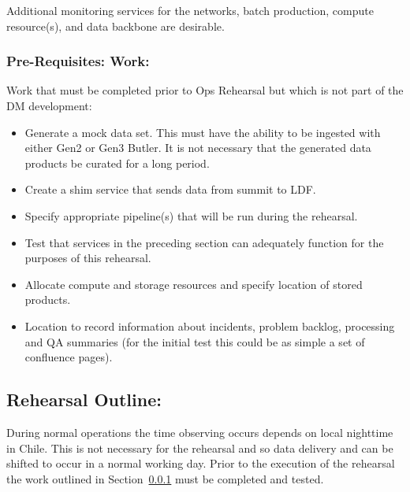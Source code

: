 Additional monitoring services for the networks, batch production, compute 
resource(s), and data backbone are desirable.

\subsubsection{Pre-Requisites: Work:}\label{prework}

Work that must be completed prior to Ops Rehearsal but which is not part of 
the DM development:
\begin{itemize}[topsep=-8pt]
\item Generate a mock data set.  This must have the ability to be ingested with 
either Gen2 or Gen3 Butler.  It is not necessary that the generated data 
products be curated for a long period.
\item Create a shim service that sends data from summit to LDF.
\item Specify appropriate pipeline(s) that will be run during the rehearsal.
\item Test that services in the preceding section can adequately function 
for the purposes of this rehearsal.
\item Allocate compute and storage resources and specify location of stored 
products.
\item Location to record information about incidents, problem backlog, 
processing and QA summaries (for the initial test this could be as simple a 
set of confluence pages).
\end{itemize}


\subsection{Rehearsal Outline:}
During normal operations the time observing occurs depends on local nighttime
in Chile.  This is not necessary for the rehearsal and so data delivery and
can be shifted to occur in a normal working day.  Prior to the execution of 
the rehearsal the work outlined in Section~\ref{prework} must be completed
and tested.

